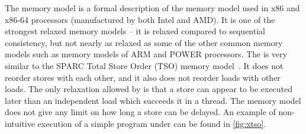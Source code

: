 The \xtso memory model is a formal description of the memory model used in x86
and x86-64 processors (manufactured by both Intel and AMD).
It is one of the strongest relaxed memory models -- it is relaxed compared to
sequential consistency, but not nearly as relaxed as some of the other common
memory models such as memory models of ARM and POWER processors.
The \xtso is very similar to the SPARC Total Store Order (TSO) memory
model~.
It does not reorder stores with each other, and it also does not reorder loads
with other loads.
The only relaxation allowed by \xtso is that a store can appear to be executed
later than an independent load which succeeds it in a thread.
The memory model does not give any limit on how long a store can be delayed.
An example of non-intuitive execution of a simple program under \xtso can be
found in \autoref{fig:xtso}.

